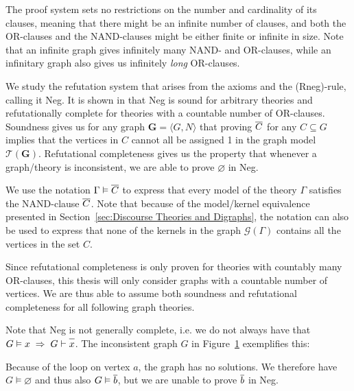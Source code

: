 The proof system sets no restrictions on the number and cardinality of its clauses, meaning that there might be an infinite number of clauses, and both the OR-clauses and the NAND-clauses might be either finite or infinite in size.
Note that an infinite graph gives infinitely many NAND- and OR-clauses, while an infinitary graph also gives us infinitely \textit{long} OR-clauses.

We study the refutation system that arises from the axioms and the (Rneg)-rule, calling it Neg.
It is shown in \cite{michal-completeness} that Neg is sound for arbitrary theories and refutationally complete for theories with a countable number of OR-clauses.
Soundness gives us for any graph $\mathbf{G} = \langle G,N \rangle$ that proving $\ol{C}$ for any $C \subseteq G$ implies that the vertices in $C$ cannot all be assigned 1 in the graph model $\mathcal{T}(\mathbf{G})$.
Refutational completeness gives us the property that whenever a graph/theory is inconsistent, we are able to prove $\varnothing$ in Neg.

We use the notation $\Gamma \vDash \ol{C}$ to express that every model of the theory $\Gamma$ satisfies the NAND-clause $\ol{C}$.
Note that because of the model/kernel equivalence presented in Section~\ref{sec:Discourse Theories and Digraphs}, the notation can also be used to express that none of the kernels in the graph $\mathcal{G}(\Gamma)$ contains all the vertices in the set $C$.

Since refutational completeness is only proven for theories with countably many OR-clauses, this thesis will only consider graphs with a countable number of vertices.
We are thus able to assume both soundness and refutational completeness for all following graph theories.

Note that Neg is not generally complete, i.e. we do not always have that $G\vDash {x} \; \Rightarrow \; G \vdash \ol{x}$.
The inconsistent graph $G$ in Figure~\ref{fig:neg_not_complete} exemplifies this:\par
\begin{figure}[!h]
  \centering
  \caption{}
  \label{fig:neg_not_complete}
\end{figure}
\FloatBarrier
Because of the loop on vertex $a$, the graph has no solutions.
We therefore have $G \vDash \varnothing$ and thus also $G \vDash \ol{b}$, but we are unable to prove $\ol{b}$ in Neg.
